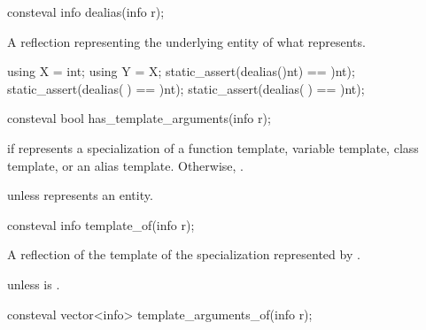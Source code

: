 %
\begin{itemdecl}
consteval info dealias(info r);
\end{itemdecl}

\begin{itemdescr}
\pnum
\returns
A reflection representing the underlying entity of what  represents.
\begin{example}
\begin{codeblock}
using X = int;
using Y = X;
static_assert(dealias(^^int) == ^^int);
static_assert(dealias(^^X) == ^^int);
static_assert(dealias(^^Y) == ^^int);
\end{codeblock}
\end{example}
\end{itemdescr}

%
\begin{itemdecl}
consteval bool has_template_arguments(info r);
\end{itemdecl}

\begin{itemdescr}
\pnum
\returns
{} if  represents a specialization of a
function template,
variable template,
class template, or
an alias template.
Otherwise, .

\pnum
\throws
{} unless
 represents an entity.
\end{itemdescr}

%
\begin{itemdecl}
consteval info template_of(info r);
\end{itemdecl}

\begin{itemdescr}
\pnum
\returns
A reflection of the template of the specialization represented by .

\pnum
\throws
{} unless
 is .
\end{itemdescr}

%
\begin{itemdecl}
consteval vector<info> template_arguments_of(info r);
\end{itemdecl}

